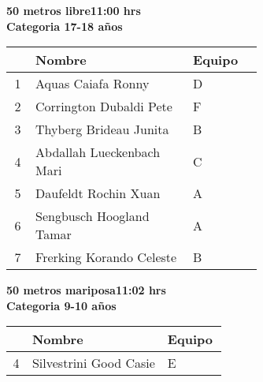 \begin{minipage}{0.95\linewidth}\vspace{0.5cm} 
\begin{flushleft}
\textbf{
\hspace{-0.15cm}50 metros libre\hspace{1.5cm}11:00 hrs \\Categoria 17-18 años}\vspace{-0.2cm} 
\end{flushleft}
\begin{tabular}{cp{0.63\linewidth}l}
\hline
& \textbf{Nombre} & \textbf{Equipo} \\ \hline
1 & Aquas Caiafa Ronny & D \\ 
2 & Corrington Dubaldi Pete & F \\ 
3 & Thyberg Brideau Junita & B \\ 
4 & Abdallah Lueckenbach Mari & C \\ 
5 & Daufeldt Rochin Xuan & A \\ 
6 & Sengbusch Hoogland Tamar & A \\ 
7 & Frerking Korando Celeste & B \\ 
\end{tabular}
\end{minipage}
\begin{minipage}{0.95\linewidth}\vspace{0.5cm} 
\begin{flushleft}
\textbf{
\hspace{-0.15cm}50 metros mariposa\hspace{1.5cm}11:02 hrs \\Categoria 9-10 años}\vspace{-0.2cm} 
\end{flushleft}
\begin{tabular}{cp{0.63\linewidth}l}
\hline
& \textbf{Nombre} & \textbf{Equipo} \\ \hline
4 & Silvestrini Good Casie & E \\ 
\end{tabular}
\end{minipage}
